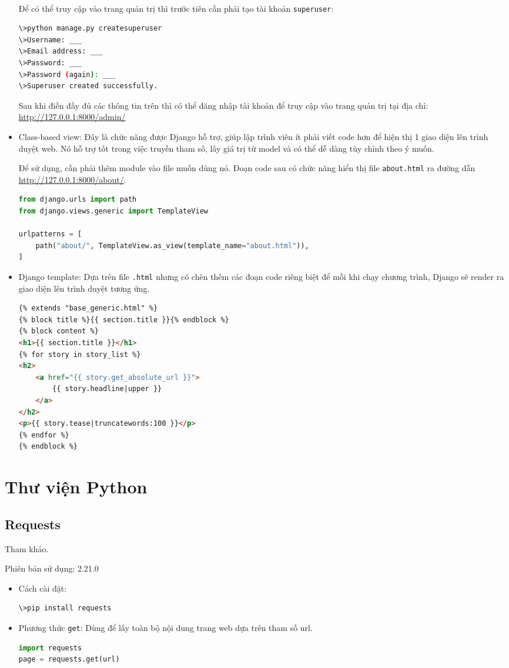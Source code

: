 \begin{itemize}
	\\\par
	Để có thể truy cập vào trang quản trị thì trước tiên cần phải tạo tài khoản \texttt{superuser}:
	\begin{lstlisting}[language=bash]
\>python manage.py createsuperuser
\>Username: ___
\>Email address: ___
\>Password: ___
\>Password (again): ___
\>Superuser created successfully.
	\end{lstlisting}
	Sau khi điền đầy đủ các thông tin trên thì có thể đăng nhập tài khoản để truy cập vào trang quản trị tại địa chỉ: \url{http://127.0.0.1:8000/admin/}
	\item Class-based view: Đây là chức năng được Django hỗ trợ, giúp lập trình viên ít phải viết code hơn để hiện thị 1 giao diện lên trình duyệt web. Nó hỗ trợ tốt trong việc truyền tham số, lấy giá trị từ model và có thể dễ dàng tùy chỉnh theo ý muốn.
	\\\par
	Để sử dụng, cần phải thêm module vào file muốn dùng nó. Đoạn code sau có chức năng hiển thị file \texttt{about.html} ra đường dẫn \url{http://127.0.0.1:8000/about/}.
	\begin{lstlisting}[language=Python]
from django.urls import path
from django.views.generic import TemplateView

urlpatterns = [
	path("about/", TemplateView.as_view(template_name="about.html")),
]
	\end{lstlisting}
	\item Django template: Dựa trên file \texttt{.html} nhưng có chèn thêm các đoạn code riêng biệt để mỗi khi chạy chương trình, Django sẽ render ra giao diện lên trình duyệt tương ứng.
	\begin{lstlisting}[language=HTML]
{% extends "base_generic.html" %}
{% block title %}{{ section.title }}{% endblock %}
{% block content %}
<h1>{{ section.title }}</h1>
{% for story in story_list %}
<h2>
 	<a href="{{ story.get_absolute_url }}">
		{{ story.headline|upper }}
	</a>
</h2>
<p>{{ story.tease|truncatewords:100 }}</p>
{% endfor %}
{% endblock %}
	\end{lstlisting}
\end{itemize}
\section{Thư viện Python}
\subsection{Requests}
Tham khảo\cite{requests}.
\\\par
Phiên bản sử dụng: 2.21.0
\begin{itemize}
	\item Cách cài đặt:
	\begin{lstlisting}[language=bash]
\>pip install requests
	\end{lstlisting}
	\item Phương thức \texttt{get}: Dùng để 	lấy toàn bộ nội dung trang web dựa trên tham số url.
	\begin{lstlisting}[language=Python]
import requests
page = requests.get(url)
	\end{lstlisting}
\end{itemize}
